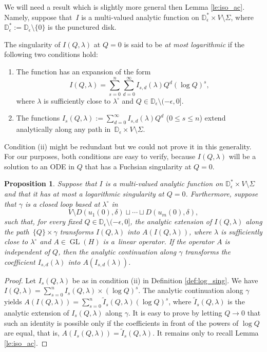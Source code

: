 \documentclass[10pt,a4paper]{article}
\numberwithin{equation}{section}
\newtheorem{Proposition}[Theorem]{Proposition}
\begin{document}
We will need a result which is slightly more general then Lemma \ref{le:iso_ac}. Namely, suppose that~$I$ is a multi-valued analytic function on $\mathbb{D}_\epsilon^*\times V\setminus{\Sigma}$, where $\mathbb{D}_\epsilon^*:=\mathbb{D}_\epsilon\setminus{\{0\}}$ is the punctured disk.
\begin{Definition}\label{def:log_sing}
The singularity of $I(Q,\lambda)$ at $Q=0$ is said to be {\em at most logarithmic} if the following two conditions hold:
\begin{enumerate}\itemsep=0pt
\item[(i)] The function has an expansion of the form
\[
I(Q,\lambda) =\sum_{s=0}^n \sum_{d=0}^\infty I_{s,d}(\lambda) Q^d (\log Q)^s,
\]
where $\lambda$ is sufficiently close to $\lambda^\circ$ and $Q\in \mathbb{D}_\epsilon\setminus{(-\epsilon,0]}$.
\item[(ii)] The functions $I_s(Q,\lambda):=\sum_{d=0}^\infty I_{s,d}(\lambda) Q^d$ ($0\leq s\leq n$) extend analytically along any path in~$\mathbb{D}_\epsilon\times V\setminus{\Sigma}$.
\end{enumerate}
\end{Definition}
\begin{Remark}
Condition (ii) might be redundant but we could not prove it in this generality. For our purposes, both conditions are easy to verify, because $I(Q,\lambda)$ will be a solution to an ODE in $Q$ that has a Fuchsian singularity at $Q=0$.
\end{Remark}
\begin{Proposition}\label{prop:iso_ac}
Suppose that $I$ is a multi-valued analytic function on $\mathbb{D}_\epsilon^*\times V\setminus{\Sigma}$ and that it has at most a logarithmic singularity at $Q=0$. Furthermore, suppose that $\gamma$ is a closed loop based at $\lambda^\circ$ in
\[
V\setminus{D(u_1(0),\delta)\sqcup\cdots \sqcup D(u_m(0),\delta)},
\]
such that, for every fixed $Q\in \mathbb{D}_\epsilon\setminus{(-\epsilon,0]}$, the analytic extension of $I(Q,\lambda)$ along the path~${\{Q\}\times \gamma}$ transforms $I(Q,\lambda)$ into $A(I(Q,\lambda))$, where $\lambda$ is sufficiently close to $\lambda^\circ$ and $A\in \operatorname{GL}(H)$ is a~linear operator. If the operator $A$ is independent of $Q$, then the analytic continuation along $\gamma$ transforms the coefficient $I_{s,d}(\lambda)$ into $A(I_{s,d}(\lambda))$.
\end{Proposition}
\begin{proof}
Let $I_s(Q,\lambda)$ be as in condition (ii) in Definition \ref{def:log_sing}. We have $I(Q,\lambda) = \sum_{s=0}^n I_s(Q,\lambda) \allowbreak\times(\log Q)^s$. The analytic continuation along $\gamma$ yields $A(I(Q,\lambda)) = \sum_{s=0}^n \widetilde{I}_s(Q,\lambda) (\log Q)^s$, where $\widetilde{I}_s(Q,\lambda)$ is the analytic extension of $I_s(Q,\lambda)$ along $\gamma$. It is easy to prove by letting $Q\to 0$ that such an identity is possible only if the coefficients in front of the powers of $\log Q$ are equal, that is, $A(I_s(Q,\lambda)) = \widetilde{I}_s(Q,\lambda)$. It remains only to recall Lemma \ref{le:iso_ac}.
\end{proof}
\end{document}
